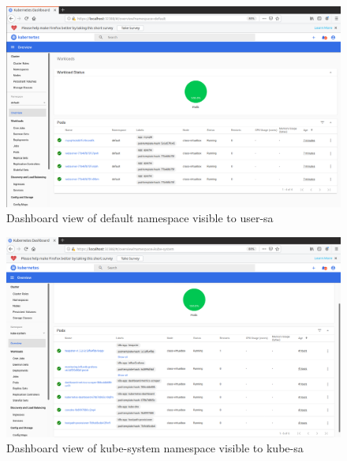\documentclass[11pt]{article}
\begin{document}
\begin{figure}[htbp]
  \centering
  \includegraphics[width=1\linewidth]{./def_dash.png}
  \caption{\label{fig:def_dash}
  Dashboard view of default namespace visible to user-sa}
\end{figure}
\begin{figure}[htbp]
  \centering
  \includegraphics[width=1\linewidth]{./kube_dash.png}
  \caption{\label{fig:kube_dash}
  Dashboard view of kube-system namespace visible to kube-sa}
\end{figure}
\end{document}
